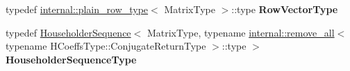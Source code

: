 \begin{DoxyCompactItemize}
\mbox{\label{class_eigen_1_1_householder_q_r_aef2e07eccf00487740690992eba6530a}} 
typedef \mbox{\hyperlink{struct_eigen_1_1internal_1_1plain__row__type}{internal\+::plain\+\_\+row\+\_\+type}}$<$ Matrix\+Type $>$\+::type {\bfseries Row\+Vector\+Type}
\item 
\mbox{\label{class_eigen_1_1_householder_q_r_a3c0de7c71cdf19f7805bf5c43df0ec4a}} 
typedef \mbox{\hyperlink{class_eigen_1_1_householder_sequence}{Householder\+Sequence}}$<$ Matrix\+Type, typename \mbox{\hyperlink{struct_eigen_1_1internal_1_1remove__all}{internal\+::remove\+\_\+all}}$<$ typename H\+Coeffs\+Type\+::\+Conjugate\+Return\+Type $>$\+::type $>$ {\bfseries Householder\+Sequence\+Type}
\end{DoxyCompactItemize}
